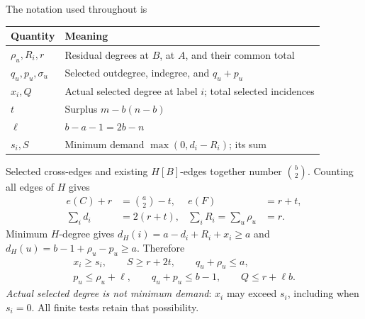 \documentclass[11pt,a4paper]{article}
\begin{document}
The notation used throughout is
\begin{center}\begin{tabular}{ll}\toprule
Quantity & Meaning\\\midrule
$\rho_u,R_i,r$ & Residual degrees at $B$, at $A$, and their common total\\
$q_u,p_u,\sigma_u$ & Selected outdegree, indegree, and $q_u+p_u$\\
$x_i,Q$ & Actual selected degree at label $i$; total selected incidences\\
$t$ & Surplus $m-b(n-b)$\\
$\ell$ & $b-a-1=2b-n$\\
$s_i,S$ & Minimum demand $\max(0,d_i-R_i)$; its sum\\\bottomrule
\end{tabular}\end{center}
Selected cross-edges and existing $H[B]$-edges together number $\binom b2$. Counting all edges of $H$ gives
\begin{align}
 e(C)+r&=\binom a2-t,& e(F)&=r+t,\label{eq:ledger}\\
 \sum_i d_i&=2(r+t),&\sum_iR_i=\sum_u\rho_u&=r.\nonumber
\end{align}
Minimum $H$-degree gives $d_H(i)=a-d_i+R_i+x_i\ge a$ and
$d_H(u)=b-1+\rho_u-p_u\ge a$. Therefore
\begin{gather}
 x_i\ge s_i,\qquad S\ge r+2t,\qquad q_u+\rho_u\le a,\label{eq:basic}\\
 p_u\le\rho_u+\ell,\qquad q_u+p_u\le b-1,\qquad Q\le r+\ell b.\nonumber
\end{gather}
\emph{Actual selected degree is not minimum demand}: $x_i$ may exceed $s_i$, including when $s_i=0$. All finite tests retain that possibility.
\end{document}
